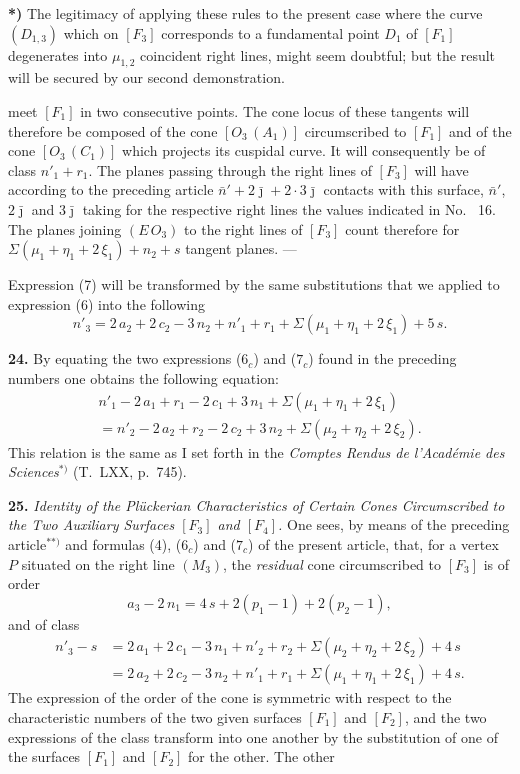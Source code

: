 \documentclass{article}
\begin{document}
\textbf{*)} The legitimacy of applying these rules to the present case where the curve $(D_{1, 3})$ which on $[F_3]$ corresponds to a fundamental point $D_1$ of $[F_1]$ degenerates into $\mu_{1, 2}$ coincident right lines, might seem doubtful; but the result will be secured by our second demonstration.

meet $[F_1]$ in two consecutive points. The cone locus of these tangents will therefore be composed of the cone $[O_3\,(A_1)]$ circumscribed to $[F_1]$ and of the cone $[O_3\,(C_1)]$ which projects its cuspidal curve. It will consequently be of class $n'_1 + r_1$. The planes passing through the right lines of $[F_3]$ will have according to the preceding article $\bar{n}' + 2\bar{\jmath} + 2\cdot 3\bar{\jmath}$ contacts with this surface, $\bar{n}'$, $2\bar{\jmath}$ and $3\bar{\jmath}$ taking for the respective right lines the values indicated in No.~ 16. The planes joining $(E\,O_3)$ to the right lines of $[F_3]$ count therefore for $\Sigma(\mu_1 + \eta_1 + 2\,\xi_1) + n_2 + s$ tangent planes. ---

Expression (7) will be transformed by the same substitutions that we applied to expression (6) into the following
\[
n'_3 = 2\,a_2 + 2\,c_2 - 3\,n_2 + n'_1 + r_1 + \Sigma(\mu_1 + \eta_1 + 2\,\xi_1) + 5\,s. \tag{$7_c$}
\]

\textbf{24.} By equating the two expressions ($6_c$) and ($7_c$) found in the preceding numbers one obtains the following equation:
\[
\begin{aligned}
n'_1 - 2\,a_1 + r_1 - 2\,c_1 + 3\,n_1 + \Sigma(\mu_1 + \eta_1 + 2\,\xi_1) \\
= n'_2 - 2\,a_2 + r_2 - 2\,c_2 + 3\,n_2 + \Sigma(\mu_2 + \eta_2 + 2\,\xi_2).
\end{aligned} \tag{II}
\]
This relation is the same as I set forth in the \emph{Comptes Rendus de l'Académie des Sciences}${}^{*)}$ (T.~LXX, p.~745).

\textbf{25.} \emph{Identity of the Plückerian Characteristics of Certain Cones Circumscribed to the Two Auxiliary Surfaces $[F_3]$ and $[F_4]$.} One sees, by means of the preceding article${}^{**)}$ and formulas (4), ($6_c$) and ($7_c$) of the present article, that, for a vertex $P$ situated on the right line $(M_3)$, the \emph{residual} cone circumscribed to $[F_3]$ is of order
\[
a_3 - 2\,n_1 = 4\,s + 2(p_1 - 1) + 2(p_2 - 1),
\]
and of class
\[
\begin{aligned}
n'_3 - s &= 2\,a_1 + 2\,c_1 - 3\,n_1 + n'_2 + r_2 + \Sigma(\mu_2 + \eta_2 + 2\,\xi_2) + 4\,s \\
&= 2\,a_2 + 2\,c_2 - 3\,n_2 + n'_1 + r_1 + \Sigma(\mu_1 + \eta_1 + 2\,\xi_1) + 4\,s.
\end{aligned}
\]
The expression of the order of the cone is symmetric with respect to the characteristic numbers of the two given surfaces $[F_1]$ and $[F_2]$, and the two expressions of the class transform into one another by the substitution of one of the surfaces $[F_1]$ and $[F_2]$ for the other. The other
\end{document}
